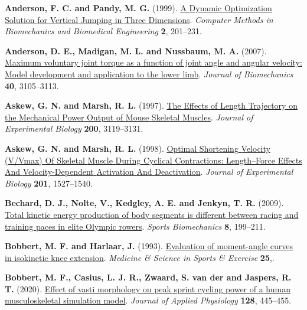 \documentclass[
  11pt,
  a4paper]{article}
\newlength{\cslhangindent}
\newenvironment{CSLReferences}[2] %
 {\begin{list}{}{%
  \setlength{\itemindent}{0pt}
  \setlength{\leftmargin}{0pt}
  \setlength{\parsep}{0pt}
  \ifodd #1
   \setlength{\leftmargin}{\cslhangindent}
   \setlength{\itemindent}{-1\cslhangindent}
  \fi
  \setlength{\itemsep}{#2\baselineskip}}}
 {\end{list}}
\begin{document}
\protect{}\label{refs}
\begin{CSLReferences}{1}{1}
\textbf{Anderson, F. C. and Pandy, M. G.} (1999).
\href{https://doi.org/10.1080/10255849908907988}{A {Dynamic}
{Optimization} {Solution} for {Vertical} {Jumping} in {Three}
{Dimensions}}. \emph{Computer Methods in Biomechanics and Biomedical
Engineering} \textbf{2}, 201--231.

\textbf{Anderson, D. E., Madigan, M. L. and Nussbaum, M. A.} (2007).
\href{https://doi.org/10.1016/j.jbiomech.2007.03.022}{Maximum voluntary
joint torque as a function of joint angle and angular velocity: {Model}
development and application to the lower limb}. \emph{Journal of
Biomechanics} \textbf{40}, 3105--3113.

\textbf{Askew, G. N. and Marsh, R. L.} (1997).
\href{https://doi.org/10.1242/jeb.200.24.3119}{The {Effects} of {Length}
{Trajectory} on the {Mechanical} {Power} {Output} of {Mouse} {Skeletal}
{Muscles}}. \emph{Journal of Experimental Biology} \textbf{200},
3119--3131.

\textbf{Askew, G. N. and Marsh, R. L.} (1998).
\href{https://doi.org/10.1242/jeb.201.10.1527}{Optimal {Shortening}
{Velocity} ({V}/{Vmax}) {Of} {Skeletal} {Muscle} {During} {Cyclical}
{Contractions}: {Length}--{Force} {Effects} {And} {Velocity}-{Dependent}
{Activation} {And} {Deactivation}}. \emph{Journal of Experimental
Biology} \textbf{201}, 1527--1540.

\textbf{Bechard, D. J., Nolte, V., Kedgley, A. E. and Jenkyn, T. R.}
(2009). \href{https://doi.org/10.1080/14763140903229518}{Total kinetic
energy production of body segments is different between racing and
training paces in elite {Olympic} rowers}. \emph{Sports Biomechanics}
\textbf{8}, 199--211.

\textbf{Bobbert, M. F. and Harlaar, J.} (1993).
\href{https://journals.lww.com/acsm-msse/fulltext/1993/02000/evaluation_of_moment_angle_curves_in_isokinetic.15.aspx}{Evaluation
of moment-angle curves in isokinetic knee extension}. \emph{Medicine \&
Science in Sports \& Exercise} \textbf{25},.

\textbf{Bobbert, M. F., Casius, L. J. R., Zwaard, S. van der and
Jaspers, R. T.} (2020).
\href{https://doi.org/10.1152/japplphysiol.00674.2018}{Effect of vasti
morphology on peak sprint cycling power of a human musculoskeletal
simulation model}. \emph{Journal of Applied Physiology} \textbf{128},
445--455.


\end{CSLReferences}
\end{document}
